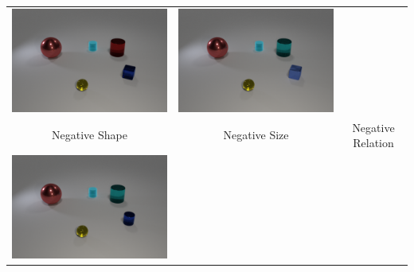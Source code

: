 \begin{table}
\begin{tabular}{@{}ccc@{}}
\begin{minipage}{.3\textwidth}
      \includegraphics[width=\linewidth]{figures/clevr_datasets/sclevr_col2.png}
    \end{minipage}
    &
    \begin{minipage}{.3\textwidth}
      \includegraphics[width=\linewidth]{figures/clevr_datasets/sclevr_mat2.png}
    \end{minipage}
\\
Negative Shape & Negative Size & Negative Relation \\
    \begin{minipage}{.3\textwidth}
      \includegraphics[width=\linewidth]{figures/clevr_datasets/sclevr_shape2.png}

\end{minipage}
\end{tabular}
\end{table}
